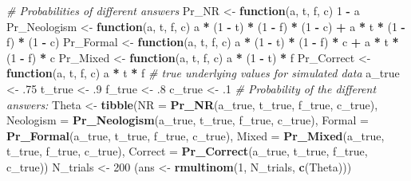 \documentclass[12pt,]{krantz}
\newenvironment{Shaded}{\begin{snugshade}}{\end{snugshade}}
\newcommand{\CommentTok}[1]{\textcolor[rgb]{0.56,0.35,0.01}{\textit{#1}}}
\newcommand{\ControlFlowTok}[1]{\textcolor[rgb]{0.13,0.29,0.53}{\textbf{#1}}}
\newcommand{\DataTypeTok}[1]{\textcolor[rgb]{0.13,0.29,0.53}{#1}}
\newcommand{\DecValTok}[1]{\textcolor[rgb]{0.00,0.00,0.81}{#1}}
\newcommand{\FloatTok}[1]{\textcolor[rgb]{0.00,0.00,0.81}{#1}}
\newcommand{\KeywordTok}[1]{\textcolor[rgb]{0.13,0.29,0.53}{\textbf{#1}}}
\newcommand{\NormalTok}[1]{#1}
\newcommand{\OperatorTok}[1]{\textcolor[rgb]{0.81,0.36,0.00}{\textbf{#1}}}
\newcommand{\StringTok}[1]{\textcolor[rgb]{0.31,0.60,0.02}{#1}}
\theoremstyle{definition}
\theoremstyle{definition}
\theoremstyle{definition}
\theoremstyle{remark}
\begin{document}
\begin{Shaded}
\begin{Highlighting}[]
\CommentTok{# Probabilities of different answers}
\NormalTok{Pr_NR <-}\StringTok{ }\ControlFlowTok{function}\NormalTok{(a, t, f, c)}
    \DecValTok{1} \OperatorTok{-}\StringTok{ }\NormalTok{a}
\NormalTok{Pr_Neologism <-}\StringTok{ }\ControlFlowTok{function}\NormalTok{(a, t, f, c)}
\NormalTok{    a }\OperatorTok{*}\StringTok{ }\NormalTok{(}\DecValTok{1} \OperatorTok{-}\StringTok{ }\NormalTok{t) }\OperatorTok{*}\StringTok{ }\NormalTok{(}\DecValTok{1} \OperatorTok{-}\StringTok{ }\NormalTok{f) }\OperatorTok{*}\StringTok{ }\NormalTok{(}\DecValTok{1} \OperatorTok{-}\StringTok{ }\NormalTok{c) }\OperatorTok{+}\StringTok{ }\NormalTok{a }\OperatorTok{*}\StringTok{ }\NormalTok{t }\OperatorTok{*}\StringTok{ }\NormalTok{(}\DecValTok{1} \OperatorTok{-}\StringTok{ }\NormalTok{f) }\OperatorTok{*}\StringTok{ }\NormalTok{(}\DecValTok{1} \OperatorTok{-}\StringTok{ }\NormalTok{c)}
\NormalTok{Pr_Formal <-}\StringTok{ }\ControlFlowTok{function}\NormalTok{(a, t, f, c)}
\NormalTok{    a }\OperatorTok{*}\StringTok{ }\NormalTok{(}\DecValTok{1} \OperatorTok{-}\StringTok{ }\NormalTok{t) }\OperatorTok{*}\StringTok{ }\NormalTok{(}\DecValTok{1} \OperatorTok{-}\StringTok{ }\NormalTok{f) }\OperatorTok{*}\StringTok{ }\NormalTok{c }\OperatorTok{+}\StringTok{  }\NormalTok{a }\OperatorTok{*}\StringTok{ }\NormalTok{t }\OperatorTok{*}\StringTok{ }\NormalTok{(}\DecValTok{1} \OperatorTok{-}\StringTok{ }\NormalTok{f) }\OperatorTok{*}\StringTok{ }\NormalTok{c}
\NormalTok{Pr_Mixed <-}\StringTok{ }\ControlFlowTok{function}\NormalTok{(a, t, f, c)}
\NormalTok{    a }\OperatorTok{*}\StringTok{ }\NormalTok{(}\DecValTok{1} \OperatorTok{-}\StringTok{ }\NormalTok{t) }\OperatorTok{*}\StringTok{ }\NormalTok{f}
\NormalTok{Pr_Correct <-}\StringTok{ }\ControlFlowTok{function}\NormalTok{(a, t, f, c)}
\NormalTok{    a }\OperatorTok{*}\StringTok{ }\NormalTok{t }\OperatorTok{*}\StringTok{ }\NormalTok{f}
\CommentTok{# true underlying values for simulated data}
\NormalTok{a_true <-}\StringTok{ }\FloatTok{.75}
\NormalTok{t_true <-}\StringTok{ }\FloatTok{.9}
\NormalTok{f_true <-}\StringTok{ }\FloatTok{.8}
\NormalTok{c_true <-}\StringTok{ }\FloatTok{.1}
\CommentTok{# Probability of the different answers:}
\NormalTok{Theta <-}\StringTok{ }\KeywordTok{tibble}\NormalTok{(}\DataTypeTok{NR =} \KeywordTok{Pr_NR}\NormalTok{(a_true, t_true, f_true, c_true),}
                \DataTypeTok{Neologism =} \KeywordTok{Pr_Neologism}\NormalTok{(a_true, t_true, f_true, c_true),}
                \DataTypeTok{Formal =} \KeywordTok{Pr_Formal}\NormalTok{(a_true, t_true, f_true, c_true),}
                \DataTypeTok{Mixed =} \KeywordTok{Pr_Mixed}\NormalTok{(a_true, t_true, f_true, c_true),}
                \DataTypeTok{Correct =} \KeywordTok{Pr_Correct}\NormalTok{(a_true, t_true, f_true, c_true))}
\NormalTok{N_trials <-}\StringTok{ }\DecValTok{200}
\NormalTok{(ans <-}\StringTok{ }\KeywordTok{rmultinom}\NormalTok{(}\DecValTok{1}\NormalTok{, N_trials, }\KeywordTok{c}\NormalTok{(Theta)))}
\end{Highlighting}
\end{Shaded}
\end{document}
